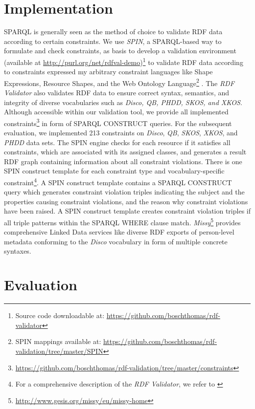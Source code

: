 \documentclass{llncs}
\begin{document}
{\section{Implementation}
\label{implementation}

SPARQL is generally seen as the method of choice to validate RDF data according to certain constraints.
We use \emph{SPIN}, 
a SPARQL-based way to formulate and check constraints, as basis to develop a
validation environment (available at \url{http://purl.org/net/rdfval-demo})\footnote{Source code downloadable at: \url{https://github.com/boschthomas/rdf-validator}} to validate RDF data according to constraints expressed my arbitrary constraint languages like Shape Expressions,
Resource Shapes, and the Web Ontology Language\footnote{SPIN mappings available at: \url{https://github.com/boschthomas/rdf-validation/tree/master/SPIN}} \cite{BoschEckert2014-2}.
The \emph{RDF Validator} also validates RDF data to ensure correct syntax, semantics, and integrity of diverse vocabularies such as \emph{Disco, QB, PHDD, SKOS, and XKOS}.
Although accessible within our validation tool, we provide all implemented constraints\footnote{\url{https://github.com/boschthomas/rdf-validation/tree/master/constraints}} in form of SPARQL CONSTRUCT queries.
For the subsequent evaluation, we implemented 213 constraints on \emph{Disco}, \emph{QB}, \emph{SKOS}, \emph{XKOS}, and \emph{PHDD} data sets.
The SPIN engine checks for each resource if it satisfies all constraints, which are associated with its assigned classes, and generates a result RDF graph containing information about all constraint violations.
There is one SPIN construct template for each constraint type and vocabulary-specific constraint\footnote{For a comprehensive description of the \emph{RDF Validator}, we refer to \cite{BoschEckert2014-2}}.
A SPIN construct template contains a SPARQL CONSTRUCT query which generates constraint violation triples indicating the subject and the properties causing constraint violations, and the reason why constraint violations have been raised.
A SPIN construct template creates constraint violation triples if all triple patterns within the SPARQL WHERE clause match.
\emph{Missy}\footnote{\url{http://www.gesis.org/missy/eu/missy-home}} provides comprehensive Linked Data services like diverse RDF exports of person-level metadata conforming to the \emph{Disco} vocabulary in form of multiple concrete syntaxes. 

\section{Evaluation}
\label{evaluation}

}
\end{document}
